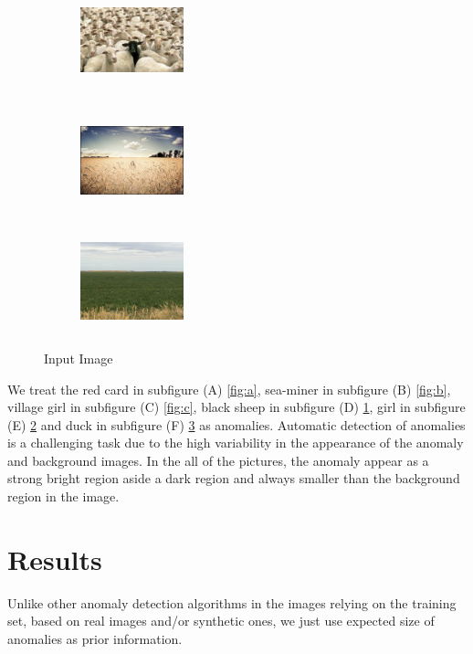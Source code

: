 \begin{figure}[t!]
\medskip
\begin{subfigure}{0.32\textwidth}
\includegraphics[height=3cm,width=3cm]{./Figures/sheep.jpg}
\caption{} \label{fig:d}
\end{subfigure}\hspace*{\fill}
\begin{subfigure}{0.32\textwidth}
\includegraphics[height=3cm,width=3cm]{./Figures/girlf.jpg}
\caption{} \label{fig:e}
\end{subfigure}
\begin{subfigure}{0.32\textwidth}
\includegraphics[height=3cm,width=3cm]{./Figures/duck.jpg}
\caption{} \label{fig:f}
\end{subfigure}

\caption{Input Image} \label{fig:input}
\end{figure}

We treat the red card in subfigure (A) \ref{fig:a}, sea-miner in subfigure (B) \ref{fig:b}, village girl in subfigure (C) \ref{fig:c}, black sheep in subfigure (D) \ref{fig:d}, girl in subfigure (E) \ref{fig:e} and duck in subfigure (F) \ref{fig:f} as anomalies. Automatic detection of anomalies is a challenging task due to the high variability in the appearance of the anomaly and background images. In the all of the pictures, the anomaly appear as a strong bright region  aside a dark region and always smaller than the background region in the image.

\section{Results}
\label{C5:Res}
Unlike other anomaly detection algorithms in the images relying on the training set, based on real images and/or synthetic ones, we just use expected size of anomalies as prior information.

